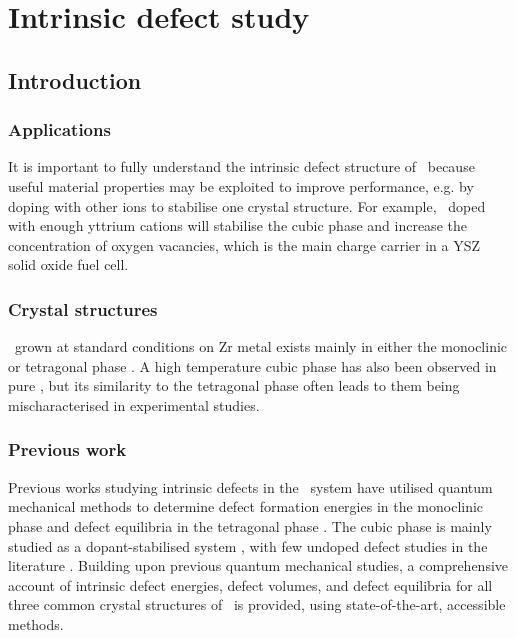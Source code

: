 \chapter{Intrinsic defect study}

\label{ch:results1} %

\section{Introduction} %
\subsection{Applications} %

It is important to fully understand the intrinsic defect structure of \zirconia\ because useful material properties may be exploited to improve performance, e.g. by doping with other ions to stabilise one crystal structure. For example, \zirconia\ doped with enough yttrium cations will stabilise the cubic phase and increase the concentration of oxygen vacancies, which is the main charge carrier in a YSZ solid oxide fuel cell.

\subsection{Crystal structures} %

\zirconia\ grown at standard conditions on Zr metal exists mainly in either the monoclinic or tetragonal phase \cite{Howard1988,teufer1962crystal}. A high temperature cubic phase has also been observed in pure \zirconia , but its similarity to the tetragonal phase often leads to them being mischaracterised in experimental studies. 

\subsection{Previous work} %

Previous works studying intrinsic defects in the \zirconia\ system have utilised quantum mechanical methods to determine defect formation energies in the monoclinic phase \cite{zheng2007first,foster2002modelling,foster2001structure} and defect equilibria in the tetragonal phase \cite{youssef2012intrinsic}. The cubic phase is mainly studied as a dopant-stabilised system \cite{orera1990intrinsic,jiang2011first}, with few undoped defect studies in the literature \cite{mackrodt1986theoretical,aarhammar2009energetics}. Building upon previous quantum mechanical studies, a comprehensive account of intrinsic defect energies, defect volumes, and defect equilibria for all three common crystal structures of \zirconia\ is provided, using state-of-the-art, accessible methods.

